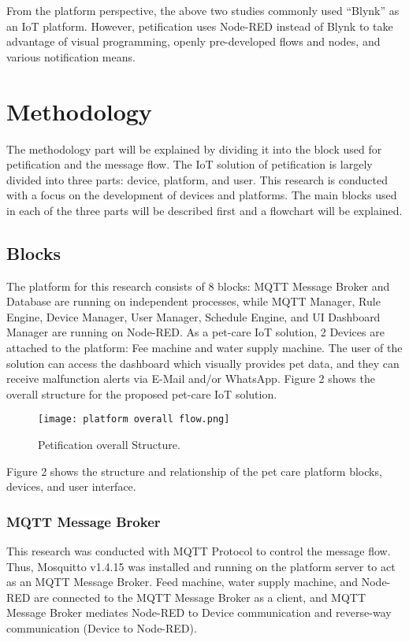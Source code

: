 \documentclass[conference]{IEEEtran}
\begin{document}
From the platform perspective, the above two studies commonly used “Blynk” as an IoT platform. However, petification uses Node-RED instead of Blynk to take advantage of visual programming, openly pre-developed flows and nodes, and various notification means.

\section{Methodology}
The methodology part will be explained by dividing it into the block used for petification and the message flow. The IoT solution of petification is largely divided into three parts: device, platform, and user. This research is conducted with a focus on the development of devices and platforms. The main blocks used in each of the three parts will be described first and a flowchart will be explained.

\subsection{Blocks}
The platform for this research consists of 8 blocks: MQTT Message Broker and Database are running on independent processes, while MQTT Manager, Rule Engine, Device Manager, User Manager, Schedule Engine, and UI Dashboard Manager are running on Node-RED. As a pet-care IoT solution, 2 Devices are attached to the platform: Fee machine and water supply machine. The user of the solution can access the dashboard which visually provides pet data, and they can receive malfunction alerts via E-Mail and/or WhatsApp. Figure 2 shows the overall structure for the proposed pet-care IoT solution.
\begin{figure}[htbp]

\centerline{\texttt{[image: platform overall flow.png]}}
\caption{Petification overall Structure.}
\label{fig}
\end{figure}

Figure 2 shows the structure and relationship of the pet care platform blocks, devices, and user interface.
\subsubsection{MQTT Message Broker}
\hfill \break This research was conducted with MQTT Protocol to control the message flow. Thus, Mosquitto v1.4.15 was installed and running on the platform server to act as an MQTT Message Broker. Feed machine, water supply machine, and Node-RED are connected to the MQTT Message Broker as a client, and MQTT Message Broker mediates Node-RED to Device communication and reverse-way communication (Device to Node-RED).
\end{document}
